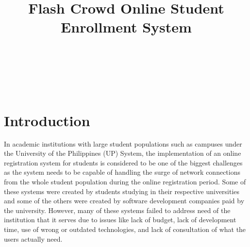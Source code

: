 \documentclass[draft]{sigchi}
\def\plaintitle{Flash Crowd Online Student Enrollment System}
\begin{document}
\title{\plaintitle}

\author{%
  \\
  \\
  \\
  \\
}

\maketitle

% 
% 

\section{Introduction}

In academic institutions with large student populations such as campuses under
the University of the Philippines (UP) System, the implementation of an online registration
system for students is considered to be one of the biggest challenges as the system needs
to be capable of handling the surge of network connections from the whole student population
during the online registration period. Some of these systems were created by students studying 
in their respective universities and some of the others were created by software development
companies paid by the university. However, many of these systems failed
to address need of the institution that it serves due to issues like lack of budget, lack of development time,
use of wrong or outdated technologies, and lack of consultation of what the users actually need.
\end{document}
